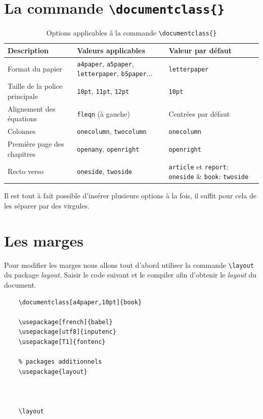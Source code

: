 \section{La commande \texttt{\textbackslash documentclass\{\}}}
\begin{table}[h]
\begin{center}
\begin{tabular}{|p{3.25cm}|p{4cm}|p{3.25cm}|}
\hline
\textbf{Description} & \textbf{Valeurs applicables} & \textbf{Valeur par défaut} \\
\hline
Format du papier & \texttt{a4paper}, \texttt{a5paper}, \texttt{letterpaper}, \texttt{b5paper}... & \texttt{letterpaper} \\
\hline
Taille de la police principale & \texttt{10pt}, \texttt{11pt}, \texttt{12pt} & \texttt{10pt} \\
\hline
Alignement des équations & \texttt{fleqn} (à gauche) & Centrées par défaut \\
\hline
Colonnes & \texttt{onecolumn}, \texttt{twocolumn} & \texttt{onecolumn} \\
\hline
Première page des chapitres & \texttt{openany}, \texttt{openright} & \texttt{openright} \\
\hline
Recto verso & \texttt{oneside}, \texttt{twoside} & \texttt{article} et \texttt{report}: \texttt{oneside} \& \texttt{book}: \texttt{twoside} \\
\hline
\end{tabular}
\caption{Options applicables à la commande \texttt{\textbackslash documentclass\{\}}}
\end{center}
\end{table}
\medskip

Il est tout à fait possible d'insérer plusieurs options à la fois, il suffit pour cela de les séparer par des virgules.
\medskip

\section{Les marges}
Pour modifier les marges nous allons tout d'abord utiliser la commande \verb|\layout| du package \textit{layout}. Saisir le code suivant et le compiler afin d'obtenir le \textit{layout} du document.
\begin{verbatim}
    \documentclass[a4paper,10pt]{book}

    \usepackage[french]{babel}
    \usepackage[utf8]{inputenc}
    \usepackage[T1]{fontenc}

    % packages additionnels
    \usepackage{layout}

    

    \layout

    
\end{verbatim}
\medskip

